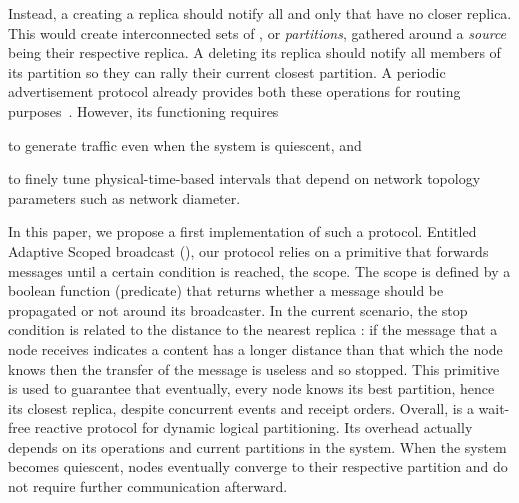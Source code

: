 Instead, a \process creating a replica should notify all and only
\processes that have no closer replica. This would create
interconnected sets of \processes, or \emph{partitions}, gathered
around a \emph{source} being their respective replica. A \process
deleting its replica should notify all members of its partition so
they can rally their current closest partition. A periodic
advertisement protocol already provides both these operations for
routing purposes~\cite{hemmati2015namebased}. However, its functioning
requires
\begin{inparaenum}[(i)]
\item to generate traffic even when the system is quiescent, and
\item to finely tune physical-time-based intervals that depend on
  network topology parameters such as network diameter.
\end{inparaenum}


In this paper, we propose a first implementation of such a protocol.
Entitled Adaptive Scoped broadcast (\NAME), 
our protocol relies on a primitive that forwards
messages until a certain condition is reached, \ie the scope. The
scope is defined by a boolean function (predicate) that returns
whether a message should be propagated or not around its
broadcaster. In the current scenario, the stop condition is related to
the distance to the nearest replica : if the message that a node receives
indicates a content has a longer distance than that which the node
knows then the transfer of the message is useless and so stopped.
%
This primitive is used to guarantee that eventually, every node knows
its best partition, hence its closest replica, despite concurrent
events and receipt orders. Overall, \NAME is a wait-free reactive protocol for
dynamic logical partitioning.  Its overhead actually depends on
its operations and current partitions in the system. When the system
becomes quiescent, nodes eventually converge to their respective
partition and do not require further communication afterward.


